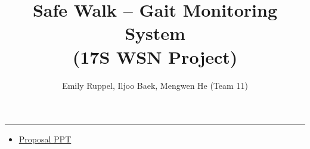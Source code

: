 \documentclass[letterpaper,12pt]{article}
\title{\textbf{Safe Walk -- Gait Monitoring System\\\small (17S WSN Project)}}
\author{Emily Ruppel, Iljoo Baek, Mengwen He (Team 11)}
\newcommand{\panhline}{\begin{center}\rule{\textwidth}{1pt}\end{center}}
\begin{document}
\maketitle

\panhline
\begin{itemize}
	\item \href{./PDFs/GaitMonitoring_Feb-24-17_v0.1.pdf}{Proposal PPT}
\end{itemize}
	
\end{document}
